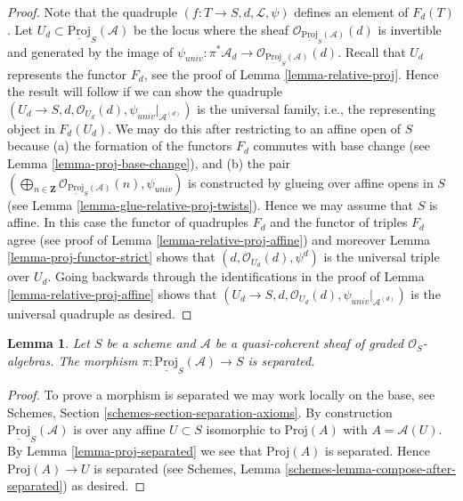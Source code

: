 \documentclass{stacks-project}
\theoremstyle{plain}
\newtheorem{lemma}[subsection]{Lemma}
\theoremstyle{definition}
\theoremstyle{remark}
\numberwithin{equation}{subsection}
\begin{document}
\begin{proof}
Note that the quadruple $(f : T \to S, d, \mathcal{L}, \psi)$
defines an element of $F_d(T)$. Let
$U_d \subset \underline{\text{Proj}}_S(\mathcal{A})$
be the locus
where the sheaf $\mathcal{O}_{\underline{\text{Proj}}_S(\mathcal{A})}(d)$
is invertible and generated by the image of
$\psi_{univ} : \pi^*\mathcal{A}_d \to
\mathcal{O}_{\underline{\text{Proj}}_S(\mathcal{A})}(d)$.
Recall that $U_d$ represents the functor $F_d$, see the proof
of Lemma \ref{lemma-relative-proj}. Hence the result will follow
if we can show the quadruple
$(U_d \to S, d, \mathcal{O}_{U_d}(d), \psi_{univ}|_{\mathcal{A}^{(d)}})$
is the universal family, i.e., the representing object in $F_d(U_d)$.
We may do this after restricting to an affine open of $S$ because
(a) the formation of the functors $F_d$ commutes with base change
(see Lemma \ref{lemma-proj-base-change}), and (b) the pair
$(\bigoplus_{n \in \mathbf{Z}}
\mathcal{O}_{\underline{\text{Proj}}_S(\mathcal{A})}(n),
\psi_{univ})$
is constructed by glueing over affine opens in $S$
(see Lemma \ref{lemma-glue-relative-proj-twists}).
Hence we may assume that $S$ is affine. In this case the functor
of quadruples $F_d$ and the functor of triples $F_d$ agree
(see proof of Lemma \ref{lemma-relative-proj-affine}) and moreover
Lemma \ref{lemma-proj-functor-strict}
shows that $(d, \mathcal{O}_{U_d}(d), \psi^d)$
is the universal triple over $U_d$.
Going backwards through the identifications in the proof of
Lemma \ref{lemma-relative-proj-affine} shows that
$(U_d \to S, d, \mathcal{O}_{U_d}(d), \psi_{univ}|_{\mathcal{A}^{(d)}})$
is the universal quadruple as desired.
\end{proof}

\begin{lemma}
\label{lemma-relative-proj-separated}
Let $S$ be a scheme and $\mathcal{A}$ be a quasi-coherent sheaf
of graded $\mathcal{O}_S$-algebras. The morphism
$\pi : \underline{\text{Proj}}_S(\mathcal{A}) \to S$
is separated.
\end{lemma}

\begin{proof}
To prove a morphism is separated we may work locally on the base,
see Schemes, Section \ref{schemes-section-separation-axioms}.
By construction $\underline{\text{Proj}}_S(\mathcal{A})$ is
over any affine $U \subset S$ isomorphic to
$\text{Proj}(A)$ with $A = \mathcal{A}(U)$. By
Lemma \ref{lemma-proj-separated} we see that $\text{Proj}(A)$ is separated.
Hence $\text{Proj}(A) \to U$ is separated (see
Schemes, Lemma \ref{schemes-lemma-compose-after-separated}) as desired.
\end{proof}
\end{document}
